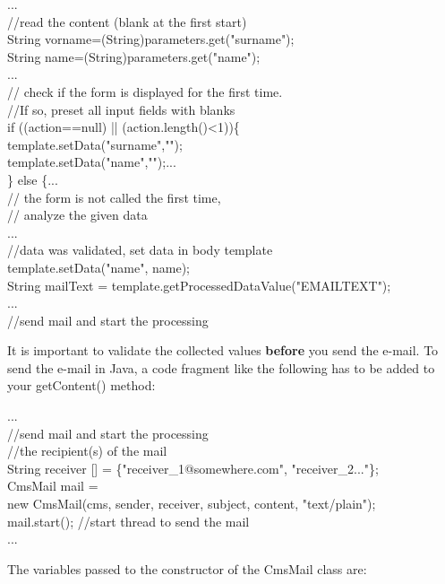 \begin{java}
...\\
//read the content (blank at the first start)\\
String vorname=(String)parameters.get("surname");\\
String name=(String)parameters.get("name");\\
...\\
// check if the form is displayed for the first time.\\
//If so, preset all input fields with blanks\\
if ((action==null) || (action.length()<1))\{\\
template.setData("surname","");\\
template.setData("name","");...\\
\} else \{...\\
// the form is not called the first time,\\
// analyze the given data\\
...\\
//data was validated, set data in body template\\
template.setData("name", name);\\
String mailText = template.getProcessedDataValue("EMAILTEXT");\\
...\\
//send mail and start the processing\\
\end{java}

It is important to validate the collected values {\bf before} you send the
e-mail. To send the e-mail in Java, a code fragment like the following
has to be added to your {\meth getContent()} method:

\begin{java}
...\\
//send mail and start the processing\\
//the recipient(s) of the mail\\
String receiver [] = \{"receiver\_1@somewhere.com", "receiver\_2..."\};\\
CmsMail mail =\\
new CmsMail(cms, sender, receiver, subject, content, "text/plain");\\
mail.start(); //start thread to send the mail\\
...\\\end{java}


The variables passed to the constructor of the {\class CmsMail} class are:

